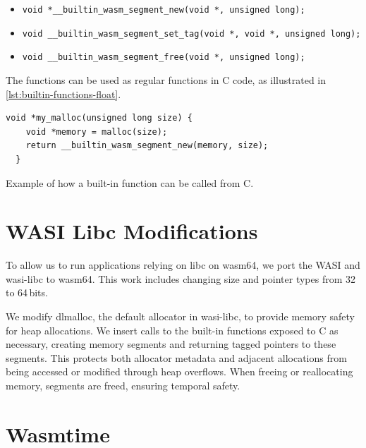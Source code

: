 \begin{itemize}
    \item[] \lstinline[style=customc]{void *__builtin_wasm_segment_new(void *, unsigned long);}
    \item[] \lstinline[style=customc]{void __builtin_wasm_segment_set_tag(void *, void *, unsigned long);}
    \item[] \lstinline[style=customc]{void __builtin_wasm_segment_free(void *, unsigned long);}
\end{itemize}

\noindent
The functions can be used as regular functions in C code, as illustrated in \cref{lst:builtin-functions-float}.

\begin{lstfloat}
    \begin{lstlisting}[frame=h,style=customc,
        label={lst:builtin-functions}]
  void *my_malloc(unsigned long size) {
    void *memory = malloc(size);
    return __builtin_wasm_segment_new(memory, size);
  }
    \end{lstlisting}
    \caption{Example of how a built-in function can be called from C.}
    \label{lst:builtin-functions-float}
\end{lstfloat}


\section{WASI Libc Modifications}
\label{sec:wasi-libc}

To allow us to run applications relying on libc on wasm64, we port the \acf{WASI} and wasi-libc to wasm64.
This work includes changing size and pointer types from 32 to 64\,bits.

We modify dlmalloc, the default allocator in wasi-libc, to provide memory safety for heap allocations.
We insert calls to the built-in functions exposed to C as necessary, creating memory segments and returning tagged pointers to these segments.
This protects both allocator metadata and adjacent allocations from being accessed or modified through heap overflows.
When freeing or reallocating memory, segments are freed, ensuring temporal safety.


\section{Wasmtime}
\label{sec:wasm-runtime}

